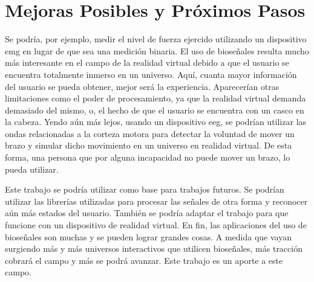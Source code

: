 \section{Mejoras Posibles y Próximos Pasos}

Se podría, por ejemplo, medir el nivel de fuerza ejercido utilizando un dispositivo \acrshort{emg} en lugar de que sea una medición binaria. El uso de bioseñales resulta mucho más interesante en el campo de la realidad virtual debido a que el usuario se encuentra totalmente inmerso en un universo. Aquí, cuanta mayor información del usuario se pueda obtener, mejor será la experiencia. Aparecerían otras limitaciones como el poder de procesamiento, ya que la realidad virtual demanda demasiado del mismo, o, el hecho de que el usuario se encuentra con un casco en la cabeza. Yendo aún más lejos, usando un dispositivo \acrshort{eeg}, se podrían utilizar las ondas relacionadas a la corteza motora para detectar la voluntad de mover un brazo y simular dicho movimiento en un universo en realidad virtual. De esta forma, una persona que por alguna incapacidad no puede mover un brazo, lo pueda utilizar.

Este trabajo se podría utilizar como base para trabajos futuros. Se podrían utilizar las librerías utilizadas para procesar las señales de otra forma y reconocer aún más estados del usuario. También se podría adaptar el trabajo para que funcione con un dispositivo de realidad virtual. En fin, las aplicaciones del uso de bioseñales son muchas y se pueden lograr grandes cosas. A medida que vayan surgiendo más y más universos interactivos que utilicen bioseñales, más tracción cobrará el campo y más se podrá avanzar. Este trabajo es un aporte a este campo.